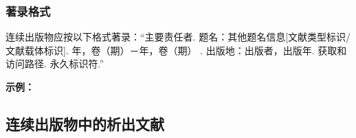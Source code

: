 \documentclass[twoside]{article}%
\begin{document}



\subsubsection{著录格式}

连续出版物应按以下格式著录：“主要责任者. 题名：其他题名信息[文献类型标识/文献载体标识]. 年，卷（期）－年，卷（期） .
出版地：出版者，出版年. 获取和访问路径. 永久标识符.”

\begin{refsection}

\nocite{
中华医学会湖北分会1984----,
中国图书馆学会1957--1990--,
AAAS1883----,
Publiclibrary1979}


\mbox{}{\small \textbf{示例：} \par}

{\printbibliography[heading=none,env=indentegenv]}
\end{refsection}

\subsection{连续出版物中的析出文献}\label{sec:entrytype:article}
\end{document}
